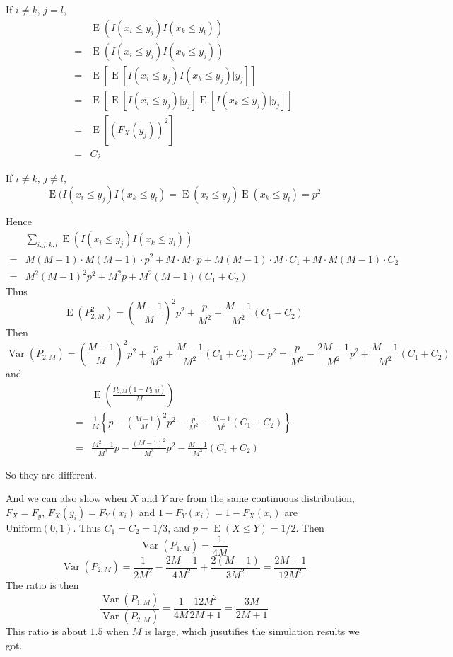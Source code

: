 \documentclass{article}
\DeclareMathOperator{\Var}{Var}
\DeclareMathOperator{\E}{E}
\begin{document}
If $i \neq k,\, j = l$,
\begin{align*}
&\E(I(x_i \leq y_j) I(x_k \leq y_l))\\
= & \E(I(x_i \leq y_j) I(x_k \leq y_j))\\
= & \E\left[\E\left[I(x_i \leq y_j)I(x_k \leq y_j)|y_j\right]\right]\\
= & \E\left[\E[I(x_i \leq y_j)|y_j] \E[I(x_k \leq y_j)|y_j]\right]\\
= & \E[(F_X(y_j))^2] \\
= & C_2
\end{align*}

If $i \neq k,\, j \neq l$,
\[\E(I(x_i \leq y_j)I(x_k \leq y_l) = \E(x_i \leq y_j) \E(x_k \leq y_l) = p^2\]

Hence
\begin{align*}
& \sum_{i,j,k,l} \E(I(x_i \leq y_j) I(x_k \leq y_l))\\
=& M(M-1)\cdot M(M-1) \cdot p^2 + M \cdot M \cdot p + M(M-1) \cdot M \cdot C_1 + M \cdot M(M-1) \cdot C_2\\
=& M^2(M-1)^2 p^2 + M^2 p + M^2 (M-1) (C_1 + C_2)
\end{align*}
Thus
\[\E(P_{2,M}^2) = \left(\frac{M-1}{M}\right)^2 p^2 + \frac{p}{M^2} + \frac{M-1}{M^2}(C_1 + C_2)\]
Then
\[\Var(P_{2,M}) = \left(\frac{M-1}{M}\right)^2 p^2 + \frac{p}{M^2} + \frac{M-1}{M^2}(C_1 + C_2) - p^2 = \frac{p}{M^2} - \frac{2M - 1}{M^2}p^2 + \frac{M-1}{M^2}(C_1 + C_2)\]
and
\begin{align*}
&\E\left(\frac{P_{2,M}(1 - P_{2,M})}{M}\right)\\
 = &\frac{1}{M}\left\{p - \left(\frac{M-1}{M}\right)^2 p^2 - \frac{p}{M^2} - \frac{M-1}{M^2}(C_1 + C_2)\right\} \\
 = &\frac{M^2 - 1}{M^3}p - \frac{(M-1)^2}{M^3}p^2 - \frac{M-1}{M^3}(C_1 + C_2)\end{align*}

 So they are different.

 And we can also show when $X$ and $Y$ are from the same continuous distribution, $F_X = F_y$, $F_X(y_i) = F_Y(x_i)$ and $1 - F_Y(x_i) = 1 - F_X(x_i)$ are $\mathrm{Uniform}(0,1)$. Thus $C_1 = C_2 = 1/3$, and $p = \E(X \leq Y) = 1/2$. Then
 \[\Var(P_{1,M}) = \frac{1}{4M}\]
 \[\Var(P_{2,M}) = \frac{1}{2M^2} - \frac{2M - 1}{4M^2} + \frac{2(M-1)}{3M^2} = \frac{2M+1}{12M^2}\]
 The ratio is then
 \[\frac{\Var(P_{1,M})}{\Var(P_{2,M})} = \frac{1}{4M}\frac{12M^2}{2M + 1} = \frac{3M}{2M + 1}\]
 This ratio is about $1.5$ when $M$ is large, which jusutifies the simulation results we got.
\end{document}
